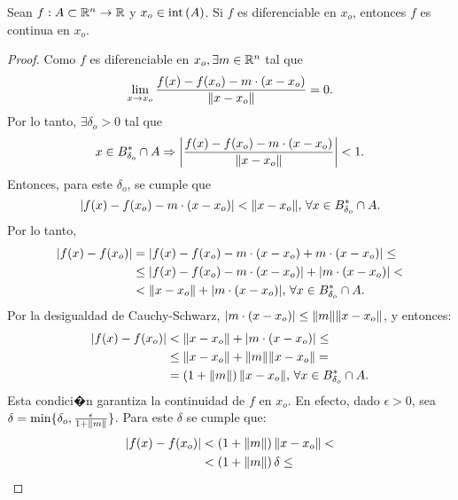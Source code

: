 \documentclass[a4paper]{scrartcl} %
\begin{document}
\begin{theorem} \label{teo:difCont}
\mbox{}

Sean $f: A \subset \mathbb{R}^n \to \mathbb{R}$ y $x_o \in \operatorname{int}{(A)}$. Si $f$ es diferenciable en $x_o$, entonces $f$ es continua en $x_o$.
 \begin{proof}
 \mbox{}
 
 Como $f$ es diferenciable en $x_o, \exists m \in \mathbb{R}^n$ tal que
 \[
  \lim_{x \to x_o} \frac{f(x) - f(x_o) - m \cdot (x - x_o)}{\norm{x - x_o}} = 0.
 \]
Por lo tanto, $\exists \delta_o > 0$ tal que 
\[
 x \in B_{\delta_o}^* \cap A \Rightarrow 
 \abs{ \frac{f(x) - f(x_o) - m \cdot (x - x_o)}{\norm{x - x_o}} } < 1.
\]
Entonces, para este $\delta_o$, se cumple que
\[
 \abs{ f(x) - f(x_o) - m \cdot (x - x_o) } < \norm{x - x_o}, \, \forall x \in B_{\delta_o}^* \cap A.
\]
Por lo tanto,
\begin{align*}
\abs{ f(x) - f(x_o) } &=   \abs{ f(x) - f(x_o) - m \cdot (x - x_o) + m \cdot (x - x_o) } \le \\
                      &\le \abs{ f(x) - f(x_o) - m \cdot (x - x_o) } + \abs{ m \cdot (x - x_o) } < \\
                      &< \norm{x - x_o} + \abs{ m \cdot (x - x_o) }, \, 
                      \forall x \in B^*_{\delta_o} \cap A.
\end{align*}
Por la desigualdad de Cauchy-Schwarz, $\abs{ m \cdot (x - x_o) } \le \norm{m} \norm{x - x_o}$, y entonces:
\begin{align*}
\abs{ f(x) - f(x_o) } &< \norm{x - x_o} + \abs{ m \cdot (x - x_o) } \le \\
                      &\le \norm{x - x_o} + \norm{m} \norm{x - x_o} = \\
                      &=  \left( 1 + \norm{m} \right) \norm{x - x_o}, \, 
                      \forall x \in B^*_{\delta_o} \cap A.
\end{align*}
Esta condici�n garantiza la continuidad de $f$ en $x_o$. En efecto, dado $\epsilon > 0$, sea $\delta = \min \{\delta_o, \frac{\epsilon}{1 + \norm{m}} \}$. Para este $\delta$ se cumple que:
\begin{align*}
 \abs{ f(x) - f(x_o) } &< \left( 1 + \norm{m} \right) \norm{x - x_o} < \\
                       &<   \left( 1 + \norm{m} \right) \delta \le \\

\end{align*}
\end{proof}
\end{theorem}
\end{document}
